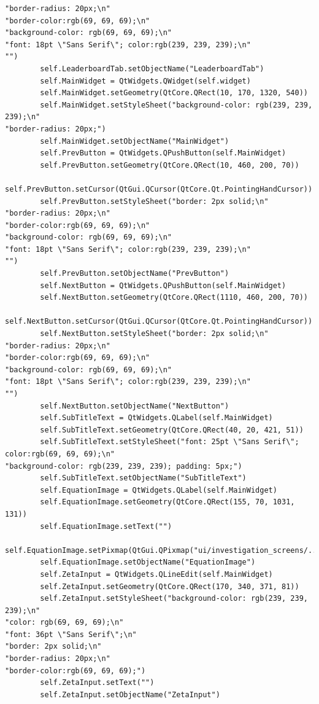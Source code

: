 \documentclass{article}
\begin{document}
\begin{lstlisting}
"border-radius: 20px;\n"
"border-color:rgb(69, 69, 69);\n"
"background-color: rgb(69, 69, 69);\n"
"font: 18pt \"Sans Serif\"; color:rgb(239, 239, 239);\n"
"")
        self.LeaderboardTab.setObjectName("LeaderboardTab")
        self.MainWidget = QtWidgets.QWidget(self.widget)
        self.MainWidget.setGeometry(QtCore.QRect(10, 170, 1320, 540))
        self.MainWidget.setStyleSheet("background-color: rgb(239, 239, 239);\n"
"border-radius: 20px;")
        self.MainWidget.setObjectName("MainWidget")
        self.PrevButton = QtWidgets.QPushButton(self.MainWidget)
        self.PrevButton.setGeometry(QtCore.QRect(10, 460, 200, 70))
        self.PrevButton.setCursor(QtGui.QCursor(QtCore.Qt.PointingHandCursor))
        self.PrevButton.setStyleSheet("border: 2px solid;\n"
"border-radius: 20px;\n"
"border-color:rgb(69, 69, 69);\n"
"background-color: rgb(69, 69, 69);\n"
"font: 18pt \"Sans Serif\"; color:rgb(239, 239, 239);\n"
"")
        self.PrevButton.setObjectName("PrevButton")
        self.NextButton = QtWidgets.QPushButton(self.MainWidget)
        self.NextButton.setGeometry(QtCore.QRect(1110, 460, 200, 70))
        self.NextButton.setCursor(QtGui.QCursor(QtCore.Qt.PointingHandCursor))
        self.NextButton.setStyleSheet("border: 2px solid;\n"
"border-radius: 20px;\n"
"border-color:rgb(69, 69, 69);\n"
"background-color: rgb(69, 69, 69);\n"
"font: 18pt \"Sans Serif\"; color:rgb(239, 239, 239);\n"
"")
        self.NextButton.setObjectName("NextButton")
        self.SubTitleText = QtWidgets.QLabel(self.MainWidget)
        self.SubTitleText.setGeometry(QtCore.QRect(40, 20, 421, 51))
        self.SubTitleText.setStyleSheet("font: 25pt \"Sans Serif\"; color:rgb(69, 69, 69);\n"
"background-color: rgb(239, 239, 239); padding: 5px;")
        self.SubTitleText.setObjectName("SubTitleText")
        self.EquationImage = QtWidgets.QLabel(self.MainWidget)
        self.EquationImage.setGeometry(QtCore.QRect(155, 70, 1031, 131))
        self.EquationImage.setText("")
        self.EquationImage.setPixmap(QtGui.QPixmap("ui/investigation_screens/../../media/riemanns_functional_equation.png"))
        self.EquationImage.setObjectName("EquationImage")
        self.ZetaInput = QtWidgets.QLineEdit(self.MainWidget)
        self.ZetaInput.setGeometry(QtCore.QRect(170, 340, 371, 81))
        self.ZetaInput.setStyleSheet("background-color: rgb(239, 239, 239);\n"
"color: rgb(69, 69, 69);\n"
"font: 36pt \"Sans Serif\";\n"
"border: 2px solid;\n"
"border-radius: 20px;\n"
"border-color:rgb(69, 69, 69);")
        self.ZetaInput.setText("")
        self.ZetaInput.setObjectName("ZetaInput")

\end{lstlisting}
\end{document}
